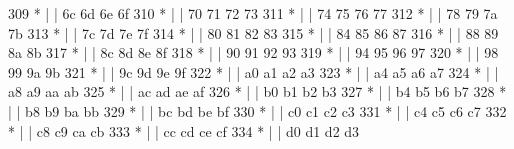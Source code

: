 \begin{DoxyCode}
309 \textcolor{comment}{         * |    |                                            6c  6d  6e  6f}
310 \textcolor{comment}{         * |    |                                            70  71  72  73}
311 \textcolor{comment}{         * |    |                                            74  75  76  77}
312 \textcolor{comment}{         * |    |                                            78  79  7a  7b}
313 \textcolor{comment}{         * |    |                                            7c  7d  7e  7f}
314 \textcolor{comment}{         * |    |                                            80  81  82  83}
315 \textcolor{comment}{         * |    |                                            84  85  86  87}
316 \textcolor{comment}{         * |    |                                            88  89  8a  8b}
317 \textcolor{comment}{         * |    |                                            8c  8d  8e  8f}
318 \textcolor{comment}{         * |    |                                            90  91  92  93}
319 \textcolor{comment}{         * |    |                                            94  95  96  97}
320 \textcolor{comment}{         * |    |                                            98  99  9a  9b}
321 \textcolor{comment}{         * |    |                                            9c  9d  9e  9f}
322 \textcolor{comment}{         * |    |                                            a0  a1  a2  a3}
323 \textcolor{comment}{         * |    |                                            a4  a5  a6  a7}
324 \textcolor{comment}{         * |    |                                            a8  a9  aa  ab}
325 \textcolor{comment}{         * |    |                                            ac  ad  ae  af}
326 \textcolor{comment}{         * |    |                                            b0  b1  b2  b3}
327 \textcolor{comment}{         * |    |                                            b4  b5  b6  b7}
328 \textcolor{comment}{         * |    |                                            b8  b9  ba  bb}
329 \textcolor{comment}{         * |    |                                            bc  bd  be  bf}
330 \textcolor{comment}{         * |    |                                            c0  c1  c2  c3}
331 \textcolor{comment}{         * |    |                                            c4  c5  c6  c7}
332 \textcolor{comment}{         * |    |                                            c8  c9  ca  cb}
333 \textcolor{comment}{         * |    |                                            cc  cd  ce  cf}
334 \textcolor{comment}{         * |    |                                            d0  d1  d2  d3}

\end{DoxyCode}
